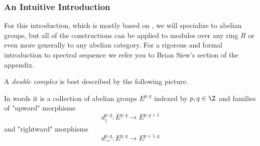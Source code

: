 \subsubsection{An Intuitive Introduction}
For this introduction, which is mostly based on \cite{risingsea}, we will specialize to abelian groups, but all of the constructions can be applied to modules over any ring $R$ or even more generally to any abelian category. For a rigorous and formal introduction to spectral sequence we refer you to Brian Siew's section of the appendix.
\begin{definition}
A \textit{double complex} is best described by the following picture.

\begin{center}\label{doublecomplex}
\end{center}

In words it is a collection of abelian groups $E^{p,q}$ indexed by $p,q\in \Z$ and families of "upward" morphisms
\begin{equation*}
    d_{\uparrow}^{p,q}: E^{p,q} \to E^{p, q+1}
\end{equation*}
and "rightward" morphisms
\begin{equation*}
    d_{\rightarrow}^{p,q}: E^{p,q} \to E^{p+1, q}
\end{equation*}


\end{definition}
